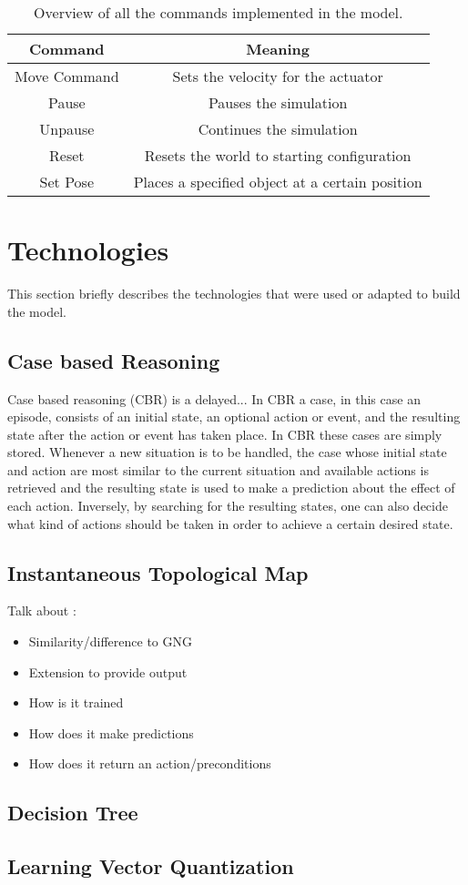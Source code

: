 \begin{table}
	\centering
\begin{tabular}{|c|c|}
	\hline \textbf{Command} & \textbf{Meaning} \\ 
	\hline Move Command & Sets the velocity for the actuator \\ 
	\hline Pause & Pauses the simulation \\
	\hline Unpause & Continues the simulation \\
	\hline Reset & Resets the world to starting configuration \\
	\hline Set Pose & Places a specified object at a certain position \\
	\hline
\end{tabular} 
\caption{Overview of all the commands implemented in the model.}
\label{tab:commands}
\end{table}



\section{Technologies\label{sec:usedTec}}

This section briefly describes the technologies that were used or adapted to 
build the model.

\subsection{Case based Reasoning\label{sec:CBR}}
Case based reasoning (CBR) is a delayed...
In CBR a case, in this case an episode, consists of an initial state, an 
optional action or event, and the resulting state after the action or event has 
taken place. In CBR these cases are simply stored. Whenever a new situation is 
to be handled, the case whose initial state and action are most similar to the 
current situation and available actions is retrieved and the resulting state is 
used to make a prediction about the effect of each action. Inversely, by 
searching for the resulting states, one can also decide what kind of actions 
should be taken in order to achieve a certain desired state. 


\subsection{Instantaneous Topological Map \label{sec:ITM}}
Talk about :
\begin{itemize}
	\item Similarity/difference to GNG
	\item Extension to provide output
	\item How is it trained
	\item How does it make predictions
	\item How does it return an action/preconditions
\end{itemize}

\subsection{Decision Tree}

\subsection{Learning Vector Quantization}